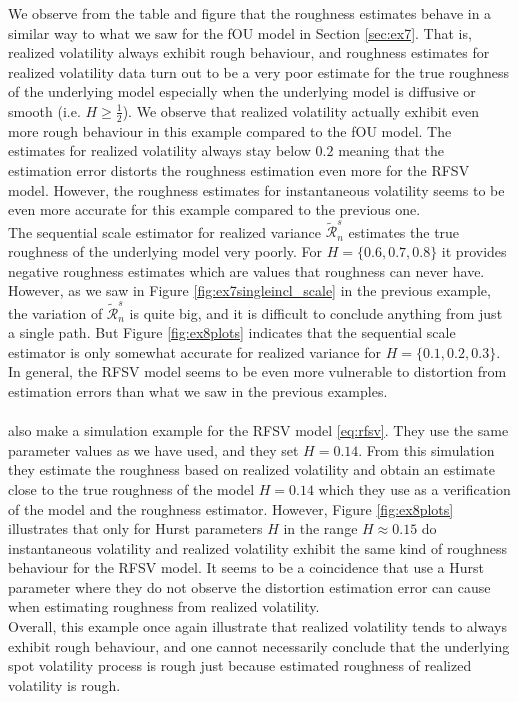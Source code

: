 \documentclass{article}
\begin{document}
We observe from the table and figure that the roughness estimates behave in a similar way to what we saw for the fOU model in Section \ref{sec:ex7}. That is, realized volatility always exhibit rough behaviour, and roughness estimates for realized volatility data turn out to be a very poor estimate for the true roughness of the underlying model especially when the underlying model is diffusive or smooth (i.e. $H\geq \frac{1}{2}$). We observe that realized volatility actually exhibit even more rough behaviour in this example compared to the fOU model. The estimates for realized volatility always stay below $0.2$ meaning that the estimation error distorts the roughness estimation even more for the RFSV model. However, the roughness estimates for instantaneous volatility seems to be even more accurate for this example compared to the previous one.\\
The sequential scale estimator for realized variance $\widetilde{\mathscr{R}}_n^s$ estimates the true roughness of the underlying model very poorly. For $H=\{0.6,0.7,0.8\}$ it provides negative roughness estimates which are values that roughness can never have. However, as we saw in Figure \ref{fig:ex7singleincl_scale} in the previous example, the variation of $\widetilde{\mathscr{R}}_n^s$ is quite big, and it is difficult to conclude anything from just a single path. But Figure \ref{fig:ex8plots} indicates that the sequential scale estimator is only somewhat accurate for realized variance for $H=\{0.1,0.2,0.3\}$. In general, the RFSV model seems to be even more vulnerable to distortion from estimation errors than what we saw in the previous examples.\\\\
\cite{gatheral} also make a simulation example for the RFSV model \eqref{eq:rfsv}. They use the same parameter values as we have used, and they set $H=0.14$. From this simulation they estimate the roughness based on realized volatility and obtain an estimate close to the true roughness of the model $H=0.14$ which they use as a verification of the model and the roughness estimator. However, Figure \ref{fig:ex8plots} illustrates that only for Hurst parameters $H$ in the range $H\approx 0.15$ do instantaneous volatility and realized volatility exhibit the same kind of roughness behaviour for the RFSV model. It seems to be a coincidence that \cite{gatheral} use a Hurst parameter where they do not observe the distortion estimation error can cause when estimating roughness from realized volatility.\\
Overall, this example once again illustrate that realized volatility tends to always exhibit rough behaviour, and one cannot necessarily conclude that the underlying spot volatility process is rough just because estimated roughness of realized volatility is rough.
\end{document}
